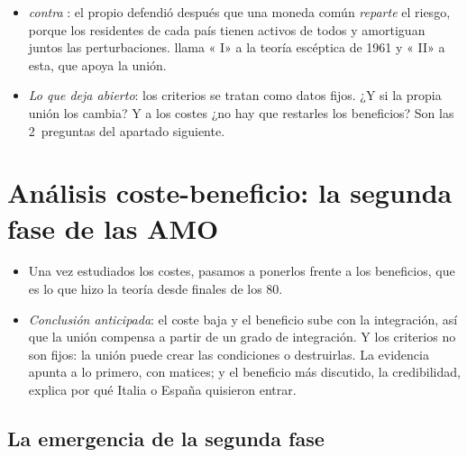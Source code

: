 \documentclass[11pt]{article}
\begin{document}
\begin{itemize}
\begin{itemize}
  \end{itemize}
\item \emph{ contra }: el propio  defendió después que una moneda común \emph{reparte} el riesgo, porque los residentes de cada país tienen activos de todos y amortiguan juntos las perturbaciones\nocite{Mundell1973Uncommon}. \textcite{McKinnon2004Optimum} llama « I» a la teoría escéptica de 1961 y « II» a esta, que apoya la unión.
\item \emph{Lo que deja abierto}: los criterios se tratan como datos fijos. ¿Y si la propia unión los cambia? Y a los costes ¿no hay que restarles los beneficios? Son las 2~preguntas del apartado siguiente.
\end{itemize}


\section{Análisis coste-beneficio: la segunda fase de las AMO}\label{sec:coste-beneficio}

\begin{itemize}
\item Una vez estudiados los costes, pasamos a ponerlos frente a los beneficios, que es lo que hizo la teoría desde finales de los 80.
\item \emph{Conclusión anticipada}: el coste baja y el beneficio sube con la integración, así que la unión compensa a partir de un grado de integración. Y los criterios no son fijos: la unión puede crear las condiciones o destruirlas. La evidencia apunta a lo primero, con matices; y el beneficio más discutido, la credibilidad, explica por qué Italia o España quisieron entrar.
\end{itemize}

\subsection{La emergencia de la segunda fase}\label{sec:segunda-fase}
\end{document}
